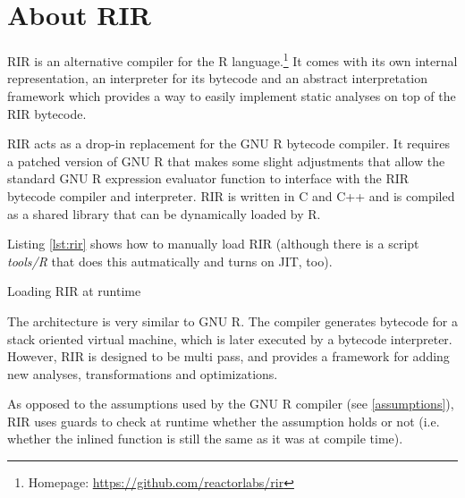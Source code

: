 \chapter{About RIR\label{rir}}

RIR is an alternative compiler for the R language.\footnote{Homepage: \url{https://github.com/reactorlabs/rir}} It comes with its own internal representation, an interpreter for its bytecode and an abstract interpretation framework which provides a way to easily implement static analyses on top of the RIR bytecode.

RIR acts as a drop-in replacement for the GNU R bytecode compiler. It requires a patched version of GNU R that makes some slight adjustments that allow the standard GNU R expression evaluator function to interface with the RIR bytecode compiler and interpreter. RIR is written in C and C++ and is compiled as a shared library that can be dynamically loaded by R.

Listing \ref{lst:rir} shows how to manually load RIR (although there is a script \emph{tools/R} that does this autmatically and turns on JIT, too).

\begin{listing}[htbp]
  \caption{\label{lst:rir}Loading RIR at runtime}
  \begin{rcode}
> dyn.load("~/rir/build/librir.so")  # path to the shared object
> source("~/rir/rir/R/rir.R")  # load the API for RIR compiler
> # RIR is now ready:
> f <- rir.compile(function() {})
> f
function() {}
<bytecode: 0x34b4510>
> rir.disassemble(f)
0x2f80538
   guard_fun_  { == 0x2077cd8
   push_  23 # NULL
   ret_ 
  \end{rcode}
\end{listing}

The architecture is very similar to GNU R. The compiler generates bytecode for a stack oriented virtual machine, which is later executed by a bytecode interpreter. However, RIR is designed to be multi pass, and provides a framework for adding new analyses, transformations and optimizations.




As opposed to the assumptions used by the GNU R compiler (see \ref{assumptions}), RIR uses guards to check at runtime whether the assumption holds or not (i.e. whether the inlined function is still the same as it was at compile time).

